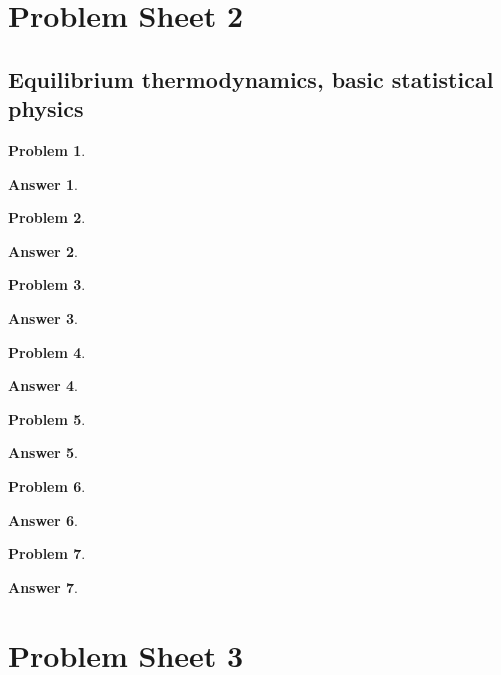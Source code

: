 \documentclass[a4paper]{article}
\newtheorem{ans}{Answer}[section]
\theoremstyle{new}
\newtheorem{qns}{Problem}[section]
\begin{document}
\section{Problem Sheet 2}
\subsection*{Equilibrium thermodynamics, basic statistical physics}
\begin{qns}

\end{qns}
\begin{ans}

\end{ans}
\begin{qns}

\end{qns}
\begin{ans}

\end{ans}
\newpage
\begin{qns}

\end{qns}
\begin{ans}

\end{ans}
\begin{qns}

\end{qns}
\begin{ans}

\end{ans}
\newpage
\begin{qns}

\end{qns}
\begin{ans}

\end{ans}
\begin{qns}

\end{qns}
\begin{ans}

\end{ans}
\newpage
\begin{qns}

\end{qns}
\begin{ans}

\end{ans}
\newpage
\section{Problem Sheet 3}
\end{document}

